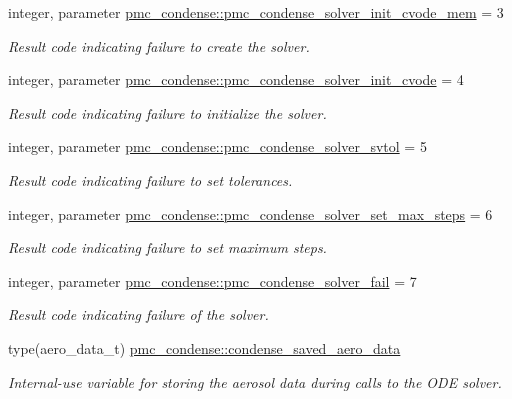 \begin{DoxyCompactItemize}
integer, parameter \mbox{\hyperlink{namespacepmc__condense_aced2822f651922c373256516609512b5}{pmc\+\_\+condense\+::pmc\+\_\+condense\+\_\+solver\+\_\+init\+\_\+cvode\+\_\+mem}} = 3
\begin{DoxyCompactList}\small\item\em Result code indicating failure to create the solver. \end{DoxyCompactList}\item 
integer, parameter \mbox{\hyperlink{namespacepmc__condense_a152d39c4bae310586811b62dad524762}{pmc\+\_\+condense\+::pmc\+\_\+condense\+\_\+solver\+\_\+init\+\_\+cvode}} = 4
\begin{DoxyCompactList}\small\item\em Result code indicating failure to initialize the solver. \end{DoxyCompactList}\item 
integer, parameter \mbox{\hyperlink{namespacepmc__condense_a728628df918109b721d5ac51252ee397}{pmc\+\_\+condense\+::pmc\+\_\+condense\+\_\+solver\+\_\+svtol}} = 5
\begin{DoxyCompactList}\small\item\em Result code indicating failure to set tolerances. \end{DoxyCompactList}\item 
integer, parameter \mbox{\hyperlink{namespacepmc__condense_acf6e894f8461ba22f0e7b8d4b55bdbdb}{pmc\+\_\+condense\+::pmc\+\_\+condense\+\_\+solver\+\_\+set\+\_\+max\+\_\+steps}} = 6
\begin{DoxyCompactList}\small\item\em Result code indicating failure to set maximum steps. \end{DoxyCompactList}\item 
integer, parameter \mbox{\hyperlink{namespacepmc__condense_a72475de47c696e1ac0386f8f0881dba3}{pmc\+\_\+condense\+::pmc\+\_\+condense\+\_\+solver\+\_\+fail}} = 7
\begin{DoxyCompactList}\small\item\em Result code indicating failure of the solver. \end{DoxyCompactList}\item 
type(aero\+\_\+data\+\_\+t) \mbox{\hyperlink{namespacepmc__condense_ae50824c600d52bf42b1ba4662d5ca40e}{pmc\+\_\+condense\+::condense\+\_\+saved\+\_\+aero\+\_\+data}}
\begin{DoxyCompactList}\small\item\em Internal-\/use variable for storing the aerosol data during calls to the O\+DE solver. \end{DoxyCompactList}\item 

\end{DoxyCompactItemize}
